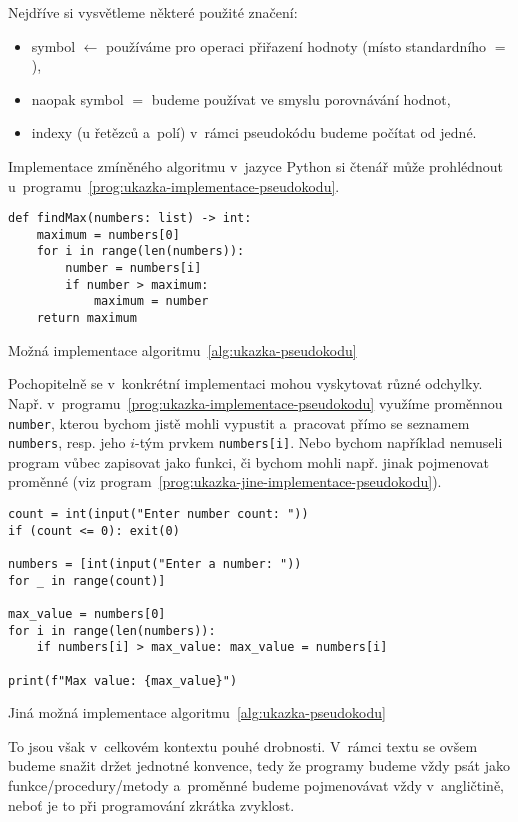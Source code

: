 Nejdříve si vysvětleme některé použité značení:
\begin{itemize}
    \item symbol $\gets$ používáme pro operaci přiřazení hodnoty (místo standardního $=$),
    \item naopak symbol $=$ budeme používat ve smyslu porovnávání hodnot,
    \item indexy (u řetězců a~polí) v~rámci pseudokódu budeme počítat od jedné.
\end{itemize}
Implementace zmíněného algoritmu v~jazyce Python si čtenář může prohlédnout u~programu~\ref{prog:ukazka-implementace-pseudokodu}.
\begin{program}[h]
\begin{lstlisting}[style=python]
def findMax(numbers: list) -> int:
    maximum = numbers[0]
    for i in range(len(numbers)):
        number = numbers[i]
        if number > maximum:
            maximum = number
    return maximum
\end{lstlisting}
    \caption{Možná implementace algoritmu~\ref{alg:ukazka-pseudokodu}}
    \label{prog:ukazka-implementace-pseudokodu}
\end{program}
Pochopitelně se v~konkrétní implementaci mohou vyskytovat různé odchylky. Např. v~programu~\ref{prog:ukazka-implementace-pseudokodu} využíme proměnnou \texttt{number}, kterou bychom jistě mohli vypustit a~pracovat přímo se seznamem \texttt{numbers}, resp. jeho $i$-tým prvkem \texttt{numbers[i]}. Nebo bychom například nemuseli program vůbec zapisovat jako funkci, či bychom mohli např. jinak pojmenovat proměnné (viz program~\ref{prog:ukazka-jine-implementace-pseudokodu}).
\begin{program}[h]
\begin{lstlisting}[style=python]
count = int(input("Enter number count: "))
if (count <= 0): exit(0)

numbers = [int(input("Enter a number: "))
for _ in range(count)]

max_value = numbers[0]
for i in range(len(numbers)):
    if numbers[i] > max_value: max_value = numbers[i]

print(f"Max value: {max_value}")
\end{lstlisting}
    \caption{Jiná možná implementace algoritmu~\ref{alg:ukazka-pseudokodu}}
    \label{prog:ukazka-jine-implementace-pseudokodu}
    \end{program}
To jsou však v~celkovém kontextu pouhé drobnosti. V~rámci textu se ovšem budeme snažit držet jednotné konvence, tedy že programy budeme vždy psát jako funkce/procedury/metody a~proměnné budeme pojmenovávat vždy v~angličtině, neboť je to při programování zkrátka zvyklost.
